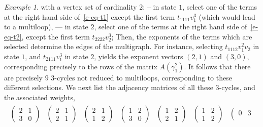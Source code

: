\documentclass{amsart}
\newcommand{\0}{\mathbf{0}}
\newcommand{\1}{\mathbf{1}}
\theoremstyle{remark}
\newtheorem{example}{Example}
\numberwithin{equation}{section} %
\begin{document}
\begin{example}
  with a vertex set of cardinality $2$: 
  --  in state $1$, select one of the
  terms at the right hand side of~\eqref{e-eq-t1}
  except the first term $t_{1111}v_1^3$ (which would lead to a multiloop),
  --- in state $2$, select one of the
  terms at the right hand side of~\eqref{e-eq-t2},
  except the first term $t_{2222}v_2^3$;
  Then, the exponents of the terms which are selected
  determine the edges of the multigraph.
  For instance, selecting
  $t_{1112}v_1^2v_2$ in state $1$, and
  $t_{2111}v_1^3$ in state $2$, yields
  the exponent vectors $(2,1)$ and $(3,0)$,
  corresponding precisely to the rows of the
  matrix $A(\gamma_1^2)$. It follows
  that there are precisely $9$ $3$-cycles not reduced
  to multiloops, corresponding
  to these different selections. We next
  list the adjacency matrices of all these
  $3$-cycles, and the associated weights,
  \begin{eqnarray*}
    \begin{array}{c|c|c|c|c|c|c|c|c}
            \left(\begin{smallmatrix}
        2 & 1 \\
         3 & 0      \end{smallmatrix}\right) &
      \left(\begin{smallmatrix}
        2 & 1 \\
         2 & 1      \end{smallmatrix}\right) &
            \left(\begin{smallmatrix}
        2 & 1 \\
         1 & 2            \end{smallmatrix}\right) &
                        \left(\begin{smallmatrix}
        1 & 2 \\
        3 & 0                        \end{smallmatrix}\right) &
                        \left(\begin{smallmatrix}
        1 & 2 \\
         2 & 1                        \end{smallmatrix}\right) &
                        \left(\begin{smallmatrix}
        1 & 2 \\
         1 & 2                        \end{smallmatrix}\right) &
                                                \left(\begin{smallmatrix}
        0 & 3 \\

\end{smallmatrix}
\end{array}
\end{eqnarray*}
\end{example}
\end{document}
